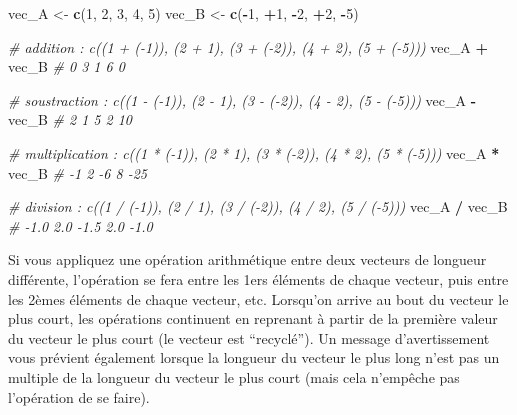 \documentclass[
]{book}
\newenvironment{Shaded}{\begin{snugshade}}{\end{snugshade}}
\newcommand{\CommentTok}[1]{\textcolor[rgb]{0.56,0.35,0.01}{\textit{#1}}}
\newcommand{\DecValTok}[1]{\textcolor[rgb]{0.00,0.00,0.81}{#1}}
\newcommand{\FunctionTok}[1]{\textcolor[rgb]{0.13,0.29,0.53}{\textbf{#1}}}
\newcommand{\NormalTok}[1]{#1}
\newcommand{\OtherTok}[1]{\textcolor[rgb]{0.56,0.35,0.01}{#1}}
\newcommand{\SpecialCharTok}[1]{\textcolor[rgb]{0.81,0.36,0.00}{\textbf{#1}}}
\begin{document}
\begin{Shaded}
\begin{Highlighting}[]
\NormalTok{vec\_A }\OtherTok{\textless{}{-}} \FunctionTok{c}\NormalTok{(}\DecValTok{1}\NormalTok{, }\DecValTok{2}\NormalTok{, }\DecValTok{3}\NormalTok{, }\DecValTok{4}\NormalTok{, }\DecValTok{5}\NormalTok{)}
\NormalTok{vec\_B }\OtherTok{\textless{}{-}} \FunctionTok{c}\NormalTok{(}\SpecialCharTok{{-}}\DecValTok{1}\NormalTok{, }\SpecialCharTok{+}\DecValTok{1}\NormalTok{, }\SpecialCharTok{{-}}\DecValTok{2}\NormalTok{, }\SpecialCharTok{+}\DecValTok{2}\NormalTok{, }\SpecialCharTok{{-}}\DecValTok{5}\NormalTok{)}

\CommentTok{\# addition : c((1 + ({-}1)), (2 + 1), (3 + ({-}2)), (4 + 2), (5 + ({-}5)))}
\NormalTok{vec\_A }\SpecialCharTok{+}\NormalTok{ vec\_B }\CommentTok{\# 0 3 1 6 0}

\CommentTok{\# soustraction : c((1 {-} ({-}1)), (2 {-} 1), (3 {-} ({-}2)), (4 {-} 2), (5 {-} ({-}5)))}
\NormalTok{vec\_A }\SpecialCharTok{{-}}\NormalTok{ vec\_B }\CommentTok{\# 2  1  5  2 10}

\CommentTok{\# multiplication : c((1 * ({-}1)), (2 * 1), (3 * ({-}2)), (4 * 2), (5 * ({-}5)))}
\NormalTok{vec\_A }\SpecialCharTok{*}\NormalTok{ vec\_B  }\CommentTok{\# {-}1   2  {-}6   8 {-}25}

\CommentTok{\# division : c((1 / ({-}1)), (2 / 1), (3 / ({-}2)), (4 / 2), (5 / ({-}5)))}
\NormalTok{vec\_A }\SpecialCharTok{/}\NormalTok{ vec\_B }\CommentTok{\# {-}1.0  2.0 {-}1.5  2.0 {-}1.0}
\end{Highlighting}
\end{Shaded}

Si vous appliquez une opération arithmétique entre deux vecteurs de longueur différente, l'opération se fera entre les 1ers éléments de chaque vecteur, puis entre les 2èmes éléments de chaque vecteur, etc. Lorsqu'on arrive au bout du vecteur le plus court, les opérations continuent en reprenant à partir de la première valeur du vecteur le plus court (le vecteur est ``recyclé''). Un message d'avertissement vous prévient également lorsque la longueur du vecteur le plus long n'est pas un multiple de la longueur du vecteur le plus court (mais cela n'empêche pas l'opération de se faire).
\end{document}
